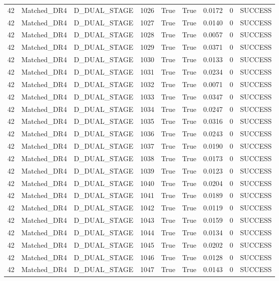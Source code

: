 \documentclass[11pt,a4paper,oneside]{book}
\begin{document}
\begin{longtable}{l l l l l l l l l}
42 & Matched\_DR4 & D\_DUAL\_STAGE & 1026 & True & True & 0.0172 & 0 & SUCCESS \\
42 & Matched\_DR4 & D\_DUAL\_STAGE & 1027 & True & True & 0.0140 & 0 & SUCCESS \\
42 & Matched\_DR4 & D\_DUAL\_STAGE & 1028 & True & True & 0.0057 & 0 & SUCCESS \\
42 & Matched\_DR4 & D\_DUAL\_STAGE & 1029 & True & True & 0.0371 & 0 & SUCCESS \\
42 & Matched\_DR4 & D\_DUAL\_STAGE & 1030 & True & True & 0.0133 & 0 & SUCCESS \\
42 & Matched\_DR4 & D\_DUAL\_STAGE & 1031 & True & True & 0.0234 & 0 & SUCCESS \\
42 & Matched\_DR4 & D\_DUAL\_STAGE & 1032 & True & True & 0.0071 & 0 & SUCCESS \\
42 & Matched\_DR4 & D\_DUAL\_STAGE & 1033 & True & True & 0.0347 & 0 & SUCCESS \\
42 & Matched\_DR4 & D\_DUAL\_STAGE & 1034 & True & True & 0.0247 & 0 & SUCCESS \\
42 & Matched\_DR4 & D\_DUAL\_STAGE & 1035 & True & True & 0.0316 & 0 & SUCCESS \\
42 & Matched\_DR4 & D\_DUAL\_STAGE & 1036 & True & True & 0.0243 & 0 & SUCCESS \\
42 & Matched\_DR4 & D\_DUAL\_STAGE & 1037 & True & True & 0.0190 & 0 & SUCCESS \\
42 & Matched\_DR4 & D\_DUAL\_STAGE & 1038 & True & True & 0.0173 & 0 & SUCCESS \\
42 & Matched\_DR4 & D\_DUAL\_STAGE & 1039 & True & True & 0.0123 & 0 & SUCCESS \\
42 & Matched\_DR4 & D\_DUAL\_STAGE & 1040 & True & True & 0.0204 & 0 & SUCCESS \\
42 & Matched\_DR4 & D\_DUAL\_STAGE & 1041 & True & True & 0.0189 & 0 & SUCCESS \\
42 & Matched\_DR4 & D\_DUAL\_STAGE & 1042 & True & True & 0.0119 & 0 & SUCCESS \\
42 & Matched\_DR4 & D\_DUAL\_STAGE & 1043 & True & True & 0.0159 & 0 & SUCCESS \\
42 & Matched\_DR4 & D\_DUAL\_STAGE & 1044 & True & True & 0.0134 & 0 & SUCCESS \\
42 & Matched\_DR4 & D\_DUAL\_STAGE & 1045 & True & True & 0.0202 & 0 & SUCCESS \\
42 & Matched\_DR4 & D\_DUAL\_STAGE & 1046 & True & True & 0.0128 & 0 & SUCCESS \\
42 & Matched\_DR4 & D\_DUAL\_STAGE & 1047 & True & True & 0.0143 & 0 & SUCCESS \\

\end{longtable}
\end{document}
